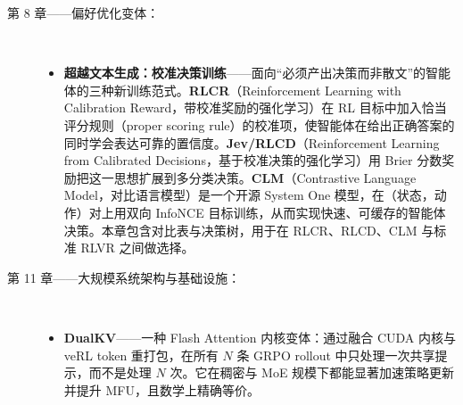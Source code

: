 \documentclass[11pt,a4paper,openany]{book}
\begin{document}
\begin{description}
  \item[第 8 章——偏好优化变体：]~
    \begin{itemize}
      \item \textbf{超越文本生成：校准决策训练}——面向“必须产出决策而非散文”的智能体的三种新训练范式。\textbf{RLCR}（Reinforcement Learning with Calibration Reward，带校准奖励的强化学习）在 RL 目标中加入恰当评分规则（proper scoring rule）的校准项，使智能体在给出正确答案的同时学会表达可靠的置信度。\textbf{Jev/RLCD}（Reinforcement Learning from Calibrated Decisions，基于校准决策的强化学习）用 Brier 分数奖励把这一思想扩展到多分类决策。\textbf{CLM}（Contrastive Language Model，对比语言模型）是一个开源 System One 模型，在（状态，动作）对上用双向 InfoNCE 目标训练，从而实现快速、可缓存的智能体决策。本章包含对比表与决策树，用于在 RLCR、RLCD、CLM 与标准 RLVR 之间做选择。
    \end{itemize}

  \item[第 11 章——大规模系统架构与基础设施：]~
    \begin{itemize}
      \item \textbf{DualKV}——一种 Flash Attention 内核变体：通过融合 CUDA 内核与 veRL token 重打包，在所有 $N$ 条 GRPO rollout 中只处理一次共享提示，而不是处理 $N$ 次。它在稠密与 MoE 规模下都能显著加速策略更新并提升 MFU，且数学上精确等价。
    \end{itemize}


\end{description}
\end{document}
